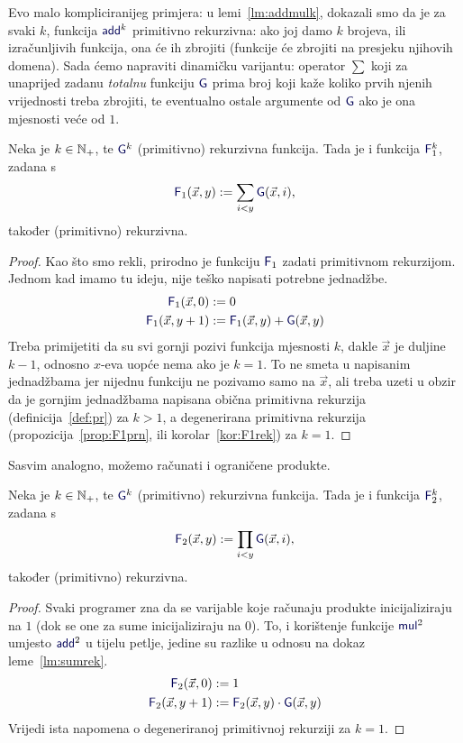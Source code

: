 Evo malo kompliciranijeg primjera: u lemi~\ref{lm:addmulk}, dokazali smo da je za svaki $k$, funkcija $\f{add}^k$ primitivno rekurzivna: ako joj damo $k$ brojeva, ili izračunljivih funkcija, ona će ih zbrojiti (funkcije će zbrojiti na presjeku njihovih domena). Sada ćemo napraviti dinamičku varijantu: operator $\sum$ koji za unaprijed zadanu \emph{totalnu} funkciju $\f G$ prima broj koji kaže koliko prvih njenih vrijednosti treba zbrojiti, te eventualno ostale argumente od $\f G$ ako je ona mjesnosti veće od $1$.

\begin{lema}\label{lm:sumrek}
Neka je $k\in{\mathbb N}_+$, te $\f G^k$\! (primitivno) rekurzivna funkcija. Tada je i funkcija $\f F_1^k$, zadana s
\begin{equation}
    \f F_1(\vec x,y):=\sum_{i<y}\f G(\vec x,i)\text,
\end{equation}
također (primitivno) rekurzivna.
\end{lema}
\begin{proof}
    Kao što smo rekli, prirodno je funkciju $\f F_1$ zadati primitivnom rekurzijom. Jednom kad imamo tu ideju, nije teško napisati potrebne jednadžbe.
    \begin{align}
        \label{eq:sumG}\f F_1(\vec x,0)&:=0
        \\
        \label{eq:sumH}
        \f F_1(\vec x,y+1)&:=\f F_1(\vec x,y)+\f G(\vec x,y)
    \end{align}
Treba primijetiti da su svi gornji pozivi funkcija mjesnosti $k$, dakle $\vec x$ je duljine $k-1$, odnosno $x$-eva uopće nema ako je $k=1$. To ne smeta u napisanim jednadžbama jer nijednu funkciju ne pozivamo samo na $\vec x$, ali treba uzeti u obzir da je gornjim jednadžbama napisana obična primitivna rekurzija (definicija~\ref{def:pr}) za $k>1$, a degenerirana primitivna rekurzija (propozicija~\ref{prop:F1prn}, ili korolar~\ref{kor:F1rek}) za $k=1$.
\end{proof}

Sasvim analogno, možemo računati i ograničene produkte. 

\begin{lema}\label{lm:prodrek}
Neka je $k\in{\mathbb N}_+$, te $\f G^k$\! (primitivno) rekurzivna funkcija. Tada je i funkcija $\f F_2^k$, zadana s
\begin{equation}
    \f F_2(\vec x,y):=\prod_{i<y}\f G(\vec x,i)\text,
\end{equation}
također (primitivno) rekurzivna.
\end{lema}
\begin{proof}
    Svaki programer zna da se varijable koje računaju produkte inicijaliziraju na $1$ (dok se one za sume inicijaliziraju na $0$). To, i korištenje funkcije $\f{mul}^2$ umjesto $\f{add}^2$ u tijelu petlje, jedine su razlike u odnosu na dokaz leme~\ref{lm:sumrek}.
    \begin{align}
        \f F_2(\vec x,0)&:=1\\
        \f F_2(\vec x,y+1)&:=\f F_2(\vec x,y)\cdot\f G(\vec x,y)
    \end{align}
Vrijedi ista napomena o degeneriranoj primitivnoj rekurziji za $k=1$.
\end{proof}


